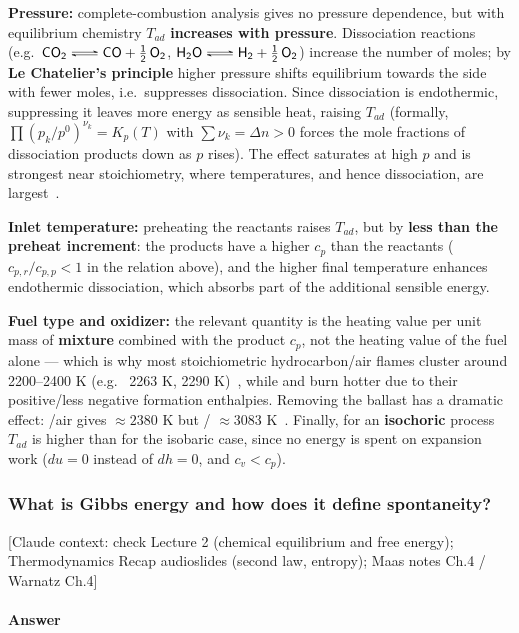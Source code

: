 {\textbf{Pressure:} complete-combustion analysis gives no pressure dependence, but with equilibrium chemistry $T_{ad}$ \textbf{increases with pressure}. Dissociation reactions (e.g.\ $\ce{CO2 <=> CO + 1/2 O2}$, $\ce{H2O <=> H2 + 1/2 O2}$) increase the number of moles; by \textbf{Le Chatelier's principle} higher pressure shifts equilibrium towards the side with fewer moles, i.e.\ suppresses dissociation. Since dissociation is endothermic, suppressing it leaves more energy as sensible heat, raising $T_{ad}$ (formally, $\prod (p_k/p^0)^{\nu_k} = K_p(T)$ with $\sum \nu_k = \Delta n > 0$ forces the mole fractions of dissociation products down as $p$ rises). The effect saturates at high $p$ and is strongest near stoichiometry, where temperatures, and hence dissociation, are largest~\cite{lecture2,glassman2014combustion}.

\textbf{Inlet temperature:} preheating the reactants raises $T_{ad}$, but by \textbf{less than the preheat increment}: the products have a higher $c_p$ than the reactants ($c_{p,r}/c_{p,p} < 1$ in the relation above), and the higher final temperature enhances endothermic dissociation, which absorbs part of the additional sensible energy.

\textbf{Fuel type and oxidizer:} the relevant quantity is the heating value per unit mass of \textbf{mixture} combined with the product $c_p$, not the heating value of the fuel alone --- which is why most stoichiometric hydrocarbon/air flames cluster around 2200--2400 K (e.g.\  2263 K,  2290 K)~\cite{lecture2}, while  and  burn hotter due to their positive/less negative formation enthalpies. Removing the  ballast has a dramatic effect: /air gives $\approx 2380$ K but / $\approx 3083$ K~\cite{maas_combustion_lecture}. Finally, for an \textbf{isochoric} process $T_{ad}$ is higher than for the isobaric case, since no energy is spent on expansion work ($du = 0$ instead of $dh = 0$, and $c_v < c_p$).
}


\subsubsection{What is Gibbs energy and how does it define spontaneity?}

{\color{gray}\footnotesize [Claude context: check Lecture 2 (chemical equilibrium and free energy); Thermodynamics Recap audioslides (second law, entropy); Maas notes Ch.4 / Warnatz Ch.4]}

\paragraph{Answer}

